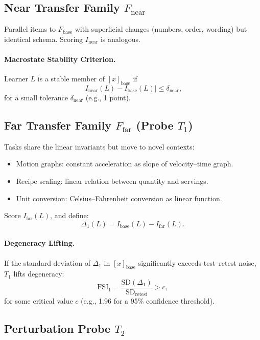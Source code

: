 \documentclass[11pt]{article}
\begin{document}
\subsection{Near Transfer Family $F_{\text{near}}$}

Parallel items to $F_{\text{base}}$ with superficial changes (numbers, order, wording) but identical schema. Scoring $I_{\text{near}}$ is analogous.

\paragraph{Macrostate Stability Criterion.}
Learner $L$ is a stable member of $[x]_{\text{base}}$ if
\[
|I_{\text{near}}(L) - I_{\text{base}}(L)| \leq \delta_{\text{near}},
\]
for a small tolerance $\delta_{\text{near}}$ (e.g., 1 point).

\subsection{Far Transfer Family $F_{\text{far}}$ (Probe $T_1$)}

Tasks share the linear invariants but move to novel contexts:

\begin{itemize}[itemsep=3pt]
  \item Motion graphs: constant acceleration as slope of velocity–time graph.
  \item Recipe scaling: linear relation between quantity and servings.
  \item Unit conversion: Celsius–Fahrenheit conversion as linear function.
\end{itemize}

Score $I_{\text{far}}(L)$, and define:
\[
\Delta_1(L) = I_{\text{base}}(L) - I_{\text{far}}(L).
\]

\paragraph{Degeneracy Lifting.}
If the standard deviation of $\Delta_1$ in $[x]_{\text{base}}$ significantly exceeds test–retest noise, $T_1$ lifts degeneracy:
\[
\mathrm{FSI}_1 = \frac{\mathrm{SD}(\Delta_1)}{\mathrm{SD}_{\text{retest}}} > c,
\]
for some critical value $c$ (e.g., 1.96 for a 95\% confidence threshold).

\subsection{Perturbation Probe $T_2$}
\end{document}
